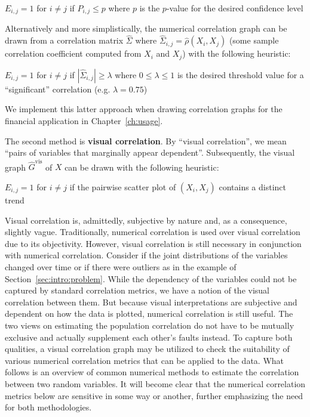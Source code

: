 \begin{algorithm}
	$E_{i,j} = 1$ for $i\neq j$ if $P_{i,j} \leq p$ where $p$ is the $p$-value 
	for the desired confidence level
\end{algorithm}

Alternatively and more simplistically, the numerical correlation graph can be 
drawn from a correlation matrix $\hat{\Sigma}$ where 
$\hat{\Sigma}_{i,j}=\hat{\rho}(X_i,X_j)$ (some sample correlation coefficient 
computed from $X_i$ and $X_j$) with the following heuristic:\\

\begin{algorithm}
	$E_{i,j} = 1$ for $i\neq j$ if $|\hat{\Sigma}_{i,j}| \geq \lambda$ where 
	$0 \leq \lambda \leq 1$ is the desired threshold value for a 
	``significant'' correlation (e.g. $\lambda = 0.75$)
\end{algorithm}

\noindent We implement this latter approach when drawing correlation 
graphs for the financial application in Chapter~\ref{ch:usage}.

The second method is \textbf{visual correlation}. By ``visual correlation'', we 
mean ``pairs of variables that marginally appear dependent''. 
Subsequently, the visual graph $\hat{G}^{\text{vis}}$ of $X$ can be drawn with 
the following heuristic:\\

\begin{algorithm}
	$E_{i,j} = 1$ for $i\neq j$ if the pairwise scatter plot of $(X_i, X_j)$ 
	contains a distinct trend
\end{algorithm}

Visual correlation is, admittedly, subjective by nature 
and, as a consequence, slightly vague. Traditionally, 
numerical correlation is used over visual correlation due to its objectivity. 
However, visual correlation is still necessary in conjunction with 
numerical correlation. Consider if the joint distributions of the variables 
changed over time or if there were outliers as in the example of 
Section~\ref{sec:intro:problem}. While the dependency of the variables could 
not be captured by standard correlation metrics, we have a notion of the visual 
correlation between them. But because visual interpretations are subjective and 
dependent on how the data is plotted, numerical correlation is still useful. 
The two views on estimating the population correlation do not have to be 
mutually exclusive and actually supplement each other's faults instead.
To capture both qualities, a visual correlation graph may be utilized to check 
the suitability of various numerical correlation metrics that can be applied to 
the data.
What follows is an overview of common numerical methods 
to estimate the correlation between two random variables. It will become clear 
that the numerical correlation metrics below are sensitive in some way or 
another, further emphasizing the need for both methodologies.

